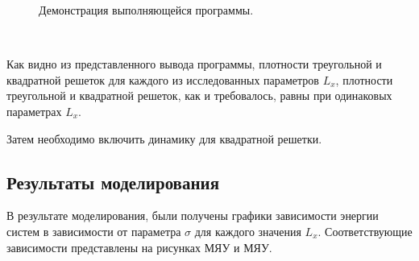 \documentclass[14pt,a4paper,report]{ncc}
\begin{document}
\begin{figure}[h]
\caption{Демонстрация выполняющейся программы.}
\label{ris:image}
\end{figure}
\

Как видно из представленного вывода программы, плотности треугольной и квадратной решеток для каждого из исследованных параметров $L_x$, плотности треугольной и квадратной решеток, как и требовалось, равны при одинаковых параметрах $L_x$.
\

Затем необходимо включить динамику для квадратной решетки. 

 \subsection{Результаты моделирования}
В результате моделирования, были получены графики зависимости энергии систем в зависимости от параметра $\sigma$ для каждого значения $L_x$. Соответствующие зависимости представлены на рисунках МЯУ и МЯУ.


 \
 
\end{document}
